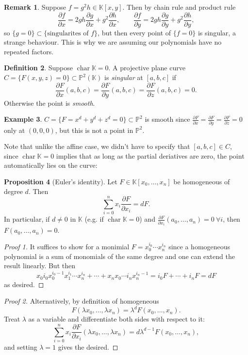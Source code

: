 \documentclass{article}
\newcommand{\K}{\mathbb{K}}
\newcommand{\p}{\mathbb{P}}
\newcommand{\Char}{\operatorname{char}}
\theoremstyle{definition}
\newtheorem{defn}{Definition}[subsection]
\newtheorem{prop}[defn]{Proposition}
\newtheorem{example}[defn]{Example}
\newtheorem{remark}[defn]{Remark}
\begin{document}
\begin{remark}
Suppose $f=g^2h\in\K[x,y]$. Then by chain rule and product rule
\[
\frac{\partial f}{\partial x}=2gh\frac{\partial g}{\partial x}+g^2\frac{\partial h}{\partial x}, \qquad \frac{\partial f}{\partial y}=2gh\frac{\partial g}{\partial y}+g^2\frac{\partial h}{\partial y},
\]
so $\{g=0\}\subset\{\text{singularites of }f\}$, but then every point of $\{f=0\}$ is singular, a strange behaviour. This is why we are assuming our polynomials have no repeated factors.
\end{remark}

\begin{defn}
Suppose $\Char\K=0$. A projective plane curve $C=\{F(x,y,z)=0\}\subset\p^2(\K)$ is \textit{singular} at $[a,b,c]$ if
\[
\frac{\partial F}{\partial x}(a,b,c)=\frac{\partial F}{\partial y}(a,b,c)=\frac{\partial F}{\partial z}(a,b,c)=0.
\]
Otherwise the point is \textit{smooth}.
\end{defn}

\begin{example}
$C=\{F=x^d+y^d+z^d=0\}\subset\p^2$ is smooth since $\frac{\partial F}{\partial x}=\frac{\partial F}{\partial y}=\frac{\partial F}{\partial z}=0$ only at $(0,0,0)$, but this is not a point in $\p^2$.
\end{example}

Note that unlike the affine case, we didn't have to specify that $[a,b,c]\in C$, since $\Char\K=0$ implies that as long as the partial deriatives are zero, the point automatically lies on the curve:
\begin{prop}[Euler's identity]
\label{prop:eulersid}
Let $F\in\K[x_0,\ldots,x_n]$ be homogeneous of degree $d$. Then
\[
\sum_{i=0}^n x_i \frac{\partial F}{\partial x_i}=dF.
\]
In particular, if $d\neq 0$ in $\K$ (e.g. if $\Char\K=0$) and $\frac{\partial F}{\partial x_i}(a_0,\ldots,a_n)=0 \ \forall i$, then $F(a_0,\ldots,a_n)=0$.
\end{prop}
\begin{proof}[Proof 1]
It suffices to show for a monimial $F=x_0^{i_0}\cdots x_n^{i_n}$ since a homogeneous polynomial is a sum of monomials of the same degree and one can extend the result linearly. But then
\[
x_0 i_0 x_0^{i_0-1}x_1^{i_1}\cdots x_n^{i_n}+\cdots+x_nx_0\cdots i_nx_n^{i_n-1}=i_0F+\cdots+i_nF=dF
\]
as desired.
\end{proof}
\begin{proof}[Proof 2]
Alternatively, by definition of homogeneous
\[
F(\lambda x_0,\ldots,\lambda x_n)=\lambda^d F(x_0,\ldots,x_n).
\]
Treat $\lambda$ as a variable and differentiate both sides with respect to it:
\[
\sum_{i=0}^n x_i\frac{\partial F}{\partial x_i}(\lambda x_0,\ldots,\lambda x_n)=d\lambda^{d-1}F(x_0,\ldots,x_n),
\]
and setting $\lambda=1$ gives the desired.
\end{proof}
\end{document}
